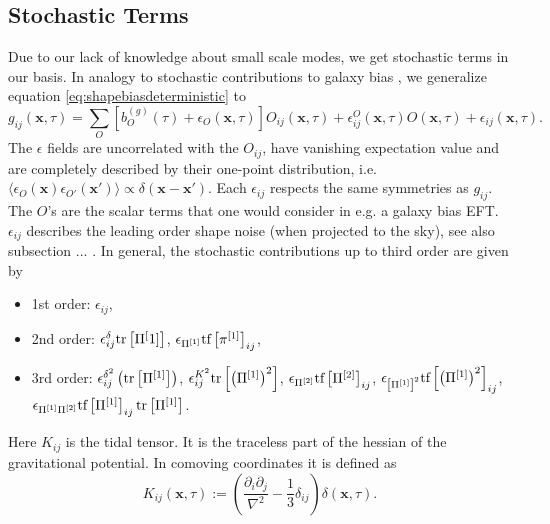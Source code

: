 \documentclass[11pt]{book}
\DeclareRobustCommand{\tr}{\ifmmode\text{tr}\else d\fi}
\DeclareRobustCommand{\tf}{\ifmmode\text{tf}\else d\fi}
\newcommand{\br}[1]{\ensuremath{\left( #1 \right)}}
\newcommand{\sbr}[1]{\ensuremath{\left[ #1 \right]}}
\begin{document}
\subsection{Stochastic Terms}
Due to our lack of knowledge about small scale modes, we get stochastic terms in our basis. In analogy to stochastic contributions to galaxy bias \cite{Desjacques_2018}, we generalize equation \ref{eq:shapebiasdeterministic} to \cite{Vlah_2020}
\begin{equation}
    g_{ij}(\mathbf x, \tau) = \sum_{O}\sbr{b^{(g)}_{O}(\tau) + \epsilon_O(\mathbf x, \tau)} O_{ij}(\mathbf x, \tau) + \epsilon_{ij}^O(\mathbf x, \tau) O(\mathbf x, \tau) + \epsilon_{ij}(\mathbf x, \tau).
\end{equation}
The $\epsilon$ fields are uncorrelated with the $O_{ij}$, have vanishing expectation value and are completely described by their one-point distribution, i.e. $\langle \epsilon_O(\mathbf x) \epsilon_{O'}(\mathbf x') \rangle \propto \delta(\mathbf x - \mathbf x')$. %
Each $\epsilon_{ij}$ respects the same symmetries as $g_{ij}$. The $O$'s are the scalar terms that one would consider in e.g. a galaxy bias EFT. $\epsilon_{ij}$ describes the leading order shape noise (when projected to the sky), see also subsection ... .
In general, the stochastic contributions up to third order are given by 
\begin{itemize}
    \item[] 1st order: $\epsilon_{ij}$,
    \item[] 2nd order: $\epsilon_{ij}^\delta\tr\sbr{\Pi^[1]}$, $\epsilon_{\Pi^{[1]}}\tf\sbr{\pi^{[1]}}_{ij}$,
    \item[] 3rd order: $\epsilon_{ij}^{\delta^2}\br{\tr\sbr{\Pi^{[1]}}}$, $\epsilon_{ij}^{K^2}\tr\sbr{\br{\Pi^{[1]}}^2}$, $\epsilon_{\Pi^{[2]}}\tf\sbr{\Pi^{[2]}}_{ij}$, $\epsilon_{\sbr{\Pi^{[1]}}^2}\tf\sbr{\br{\Pi^{[1]}}^2}_{ij}$, \\ $\epsilon_{\Pi^{[1]}\Pi^{[2]}}\tf\sbr{\Pi^{[1]}}_{ij}\tr\sbr{\Pi^{[1]}}$.
\end{itemize}
Here $K_{ij}$ is the tidal tensor. It is the traceless part of the hessian of the gravitational potential. In comoving coordinates it is defined as
\begin{equation}
    K_{ij}(\mathbf x, \tau) := \br{\frac{\partial_i\partial_j}{\nabla^2}-\frac{1}{3}\delta_{ij}}\delta(\mathbf x, \tau).
\end{equation}
\end{document}
